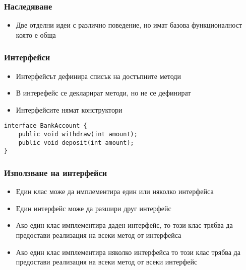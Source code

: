 \documentclass[ignorenonframetext, hyperref=unicode,compress]{beamer}
\begin{document}
\begin{frame}[containsverbatim]\frametitle{Наследяване}
\begin{center}
\end{center}

\begin{itemize}
 \item Две отделни идеи с различно поведение, но имат базова функционалност която е обща
\end{itemize}
\end{frame}

\begin{frame}[containsverbatim]\frametitle{Интерфейси}
\begin{itemize}
 \item Интерфейсът дефинира списък на достъпните методи
 \item В интерефейс се декларират методи, но не се дефинират
 \item Интерфейсите нямат конструктори
\end{itemize}
\begin{lstlisting}
interface BankAccount {
 	public void withdraw(int amount);
 	public void deposit(int amount);
}
\end{lstlisting}
\end{frame}

\begin{frame}[containsverbatim]\frametitle{Използване на интерфейси}
\begin{itemize}
 \item Един клас може да имплементира един или няколко интерфейса
 \item Един интерфейс може да разшири друг интерфейс
 \item Ако един клас имплементира даден интерфейс, то този клас трябва да 
предостави реализация на всеки метод от интерфейса
 \item Ако един клас имплементира няколко интерфейса то този клас трябва да 
предостави реализация на всеки метод от всеки интерфейс
\end{itemize}
\end{frame}
\end{document}

